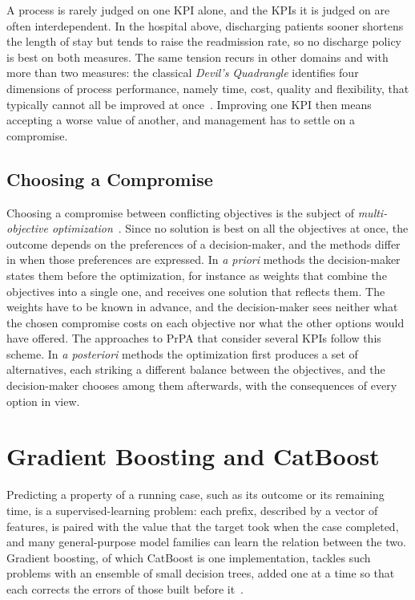     A process is rarely judged on one KPI alone, and the KPIs it is judged
    on are often interdependent. In the hospital above, discharging patients
    sooner shortens the length of stay but tends to raise the readmission
    rate, so no discharge policy is best on both measures. The same tension
    recurs in other domains and with more than two measures: the classical
    \emph{Devil's Quadrangle} identifies four dimensions of process
    performance, namely time, cost, quality and flexibility, that typically
    cannot all be improved at once~\cite{dumas2018}. Improving one KPI then
    means accepting a worse value of another, and management has to settle
    on a compromise.

    \subsection{Choosing a Compromise}
    \label{subsec:bg:prpa:compromise}
    Choosing a compromise between conflicting objectives is the subject of
    \emph{multi-objective optimization}~\cite{miettinen1999}. Since no
    solution is best on all the objectives at once, the outcome depends on
    the preferences of a decision-maker, and the methods differ in when
    those preferences are expressed. In \emph{a priori} methods the
    decision-maker states them before the optimization, for instance as
    weights that combine the objectives into a single one, and receives one
    solution that reflects them. The weights have to be known in advance,
    and the decision-maker sees neither what the chosen compromise costs on
    each objective nor what the other options would have offered. The
    approaches to PrPA that consider several KPIs follow this scheme. In
    \emph{a posteriori} methods the optimization first produces a set of
    alternatives, each striking a different balance between the objectives,
    and the decision-maker chooses among them afterwards, with the
    consequences of every option in view.

\section{Gradient Boosting and CatBoost}
\label{sec:bg:gbm}
Predicting a property of a running case, such as its outcome or its remaining
time, is a supervised-learning problem: each prefix, described by a vector of
features, is paired with the value that the target took when the case
completed, and many general-purpose model families can learn the relation
between the two. Gradient boosting, of which CatBoost is one implementation, tackles
such problems with an ensemble of small decision trees, added one at a time so
that each corrects the errors of those built before
it~\cite{friedman2001,prokhorenkova2018}.

